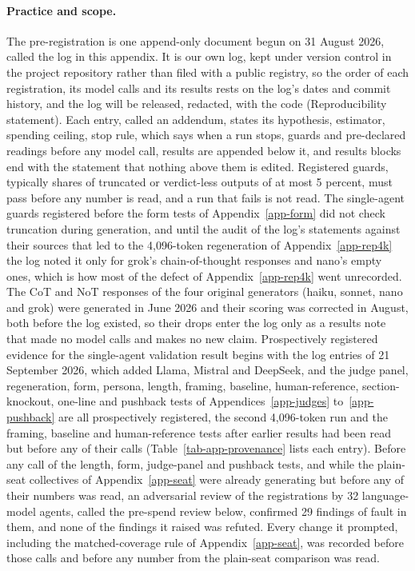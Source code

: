 \paragraph{Practice and scope.}
The pre-registration is one append-only document begun on 31 August 2026,
called the log in this appendix. It is our own log, kept under version
control in the project repository rather than filed with a public registry,
so the order of each registration, its model calls and its results rests on
the log's dates and commit history, and the log will be released, redacted,
with the code (Reproducibility statement).
Each entry, called an addendum, states its hypothesis, estimator, spending
ceiling, stop rule, which says when a run stops,
guards and pre-declared readings before any model call, results are appended
below it, and results blocks end with the statement that nothing above them
is edited. Registered guards, typically shares of truncated or verdict-less
outputs of at most 5 percent, must pass before any number is read, and a run
that fails is not read. The single-agent guards registered before the form tests of
Appendix~\ref{app-form} did not check truncation during generation, and until
the audit of the log's statements against their sources that led to the
4,096-token regeneration of Appendix~\ref{app-rep4k} the log noted it only for grok's chain-of-thought responses
and nano's empty ones, which is how most of the defect of
Appendix~\ref{app-rep4k} went unrecorded.
The CoT and NoT responses of the four original generators (haiku, sonnet,
nano and grok) were generated in June 2026 and their scoring was corrected
in August, both before the log existed, so their drops enter the log only
as a results note that made no model calls and makes no new claim.
Prospectively registered evidence for the single-agent validation result
begins with the log entries of 21 September 2026, which added Llama, Mistral
and DeepSeek, and the judge panel, regeneration, form, persona, length,
framing, baseline, human-reference, section-knockout, one-line and pushback
tests of Appendices~\ref{app-judges} to~\ref{app-pushback} are all
prospectively registered, the second 4,096-token run and the framing,
baseline and human-reference tests after earlier results had been read but
before any of their calls (Table~\ref{tab-app-provenance} lists each entry).
Before any call of the length, form, judge-panel and pushback tests, and while
the plain-seat collectives of Appendix~\ref{app-seat} were already generating
but before any of their numbers was read, an adversarial review of the
registrations by 32 language-model agents, called the pre-spend review below,
confirmed 29 findings of fault in them, and none of the findings it raised
was refuted. Every change it prompted, including the
matched-coverage rule of Appendix~\ref{app-seat}, was recorded before those
calls and before any number from the plain-seat comparison was read.


